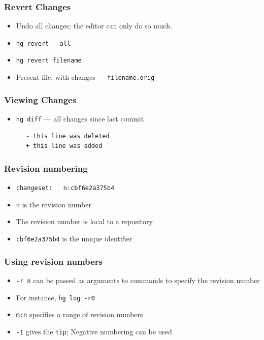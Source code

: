 \documentclass[14pt,compress]{beamer}
\newcommand{\typ}[1]{\lstinline{#1}}
\begin{document}
\begin{frame}
  \frametitle{Revert Changes}
  \begin{itemize}
  \item Undo all changes; the editor can only do so much.
  \item \typ{hg revert --all}
  \item \typ{hg revert filename}
  \item Present file, with changes --- \typ{filename.orig}
  \end{itemize}
\end{frame}

\begin{frame}[fragile]
  \frametitle{Viewing Changes}
  \begin{itemize}
  \item \typ{hg diff} --- all changes since last commit
  \end{itemize}
  \begin{block}{}
    \begin{lstlisting}
      - this line was deleted
      + this line was added
    \end{lstlisting}
  \end{block}
\end{frame}


\begin{frame}[fragile]
  \frametitle{Revision numbering}
  \begin{itemize}
  \item \typ{changeset:   n:cbf6e2a375b4}
  \item \typ{n} is the revision number
  \item The revision number is local to a repository
  \item \typ{cbf6e2a375b4} is the unique identifier
  \end{itemize}
\end{frame}

\begin{frame}[fragile]
  \frametitle{Using revision numbers}
  \begin{itemize}
  \item \typ{-r n} can be passed as arguments to commands to specify
    the revision number
  \item For instance, \typ{hg log -r0} 
  \item \typ{m:n} specifies a range of revision numbers
  \item \typ{-1} gives the \typ{tip}; Negative numbering can be used
  \end{itemize}
\end{frame}
\end{document}
